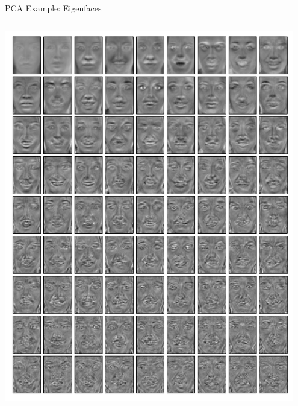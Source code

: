\documentclass[handout,aspectratio=169]{beamer}
\begin{document}
\begin{frame}{PCA Example: Eigenfaces}
\begin{columns}
			\includegraphics[width=0.95\textwidth]{media/eigenfaces.pdf}
		\end{columns}		
	\end{frame}
\end{document}
